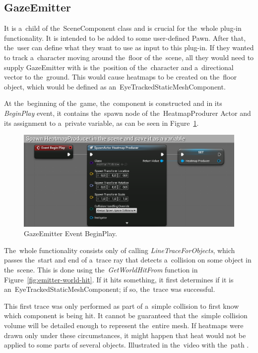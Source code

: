 \subsection{GazeEmitter}
\label{sec:gaze-emitter}

It is a~child of the~SceneComponent class and is crucial for the~whole plug-in functionality. It is intended to be added to some user-defined Pawn. After that, the~user can define what they want to use as input to this plug-in. If they wanted to track a~character moving around the~floor of the~scene, all they would need to supply GazeEmitter with is the~position of the~character and a~directional vector to the~ground. This would cause heatmaps to be created on the~floor object, which would be defined as an~EyeTrackedStaticMeshComponent.

At the~beginning of the~game, the~component is constructed and in its \emph{BeginPlay} event, it contains the~spawn node of the~HeatmapProdurer Actor and its assignment to a~private variable, as can be seen in Figure~\ref{fig:emitter-begin}.

\pagebreak{}

\begin{figure}[!ht]
    \centering
    \includegraphics[width=\textwidth]{img/gaze-emitter-begin-play.png}
    \caption{GazeEmitter Event BeginPlay.}
    \label{fig:emitter-begin}
\end{figure}

The~whole functionality consists only of calling \emph{LineTraceForObjects}, which passes the~start and end of a~trace ray that detects a~collision on some object in the~scene. This is done using the~\emph{GetWorldHitFrom} function in Figure~\ref{fig:emitter-world-hit}. If it hits something, it first determines if it is an~EyeTrackedStaticMeshComponent; if so, the~trace was successful.

This first trace was only performed as part of a~simple collision to first know which component is being hit. It cannot be guaranteed that the~simple collision volume will be detailed enough to represent the~entire mesh. If heatmaps were drawn only under these circumstances, it might happen that heat would not be applied to some parts of several objects. Illustrated in the~video with the~path .

